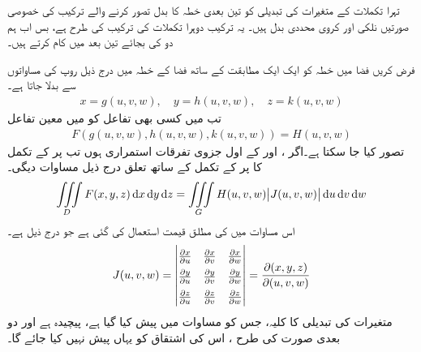 تہرا تکملات کے متغیرات کی تبدیلی کو   تین بعدی خطہ کا   بدل  تصور کرنے والے ترکیب کی خصوصی صورتیں  نلکی اور کروی محددی بدل ہیں۔ یہ ترکیب دوہرا  تکملات کی ترکیب کی طرح ہے، بس اب ہم دو کی بجائے تین بعد میں کام  کرتے ہیں۔ 

فرض کریں  فضا میں خطہ  کو  ایک ایک مطابقت کے  ساتھ  فضا کے خطہ  میں درج ذیل  روپ کی مساواتوں  سے بدلا جاتا ہے۔
\begin{align*}
x=g(u,v,w),\quad y=h(u,v,w),\quad z=k(u,v,w)
\end{align*}
تب  میں کسی بھی تفاعل  کو  میں   معین  تفاعل
\begin{align*}
F(g(u,v,w),h(u,v,w),k(u,v,w))=H(u,v,w)
\end{align*}
تصور کیا جا سکتا ہے۔اگر ،   اور  کے اول جزوی تفرقات استمراری ہوں تب  پر  کے تکمل کا  پر  کے تکمل کے ساتھ تعلق درج ذیل مساوات دیگی۔
  \begin{align}\label{مساوات_بالکثرت_یعقوبی_تہرا_تکمل}
\iiint\limits_D F(x,y,z)\dif x\dif y\dif z=\iiint\limits_G H(u,v,w)\abs{J(u,v,w)}\dif u\dif v\dif w
\end{align}
اس مساوات میں  کی مطلق قیمت استعمال کی گئی ہے جو درج ذیل  ہے۔
\begin{align}
\renewcommand{\arraystretch}{1.5}
J(u,v,w)=\begin{vmatrix}
\frac{\partial x}{\partial u}&\frac{\partial x}{\partial v}&\frac{\partial x}{\partial w}\\
\frac{\partial y}{\partial u}&\frac{\partial y}{\partial v}&\frac{\partial y}{\partial w}\\
\frac{\partial z}{\partial u}&\frac{\partial z}{\partial v}&\frac{\partial z}{\partial w}
\end{vmatrix}=\frac{\partial(x,y,z)}{\partial(u,v,w)}
\end{align} 
متغیرات کی تبدیلی کا    کلیہ، جس کو مساوات  میں پیش کیا گیا ہے، پیچیدہ ہے اور دو بعدی صورت کی طرح ، اس کی اشتقاق کو یہاں پیش نہیں کیا جائے گا۔

